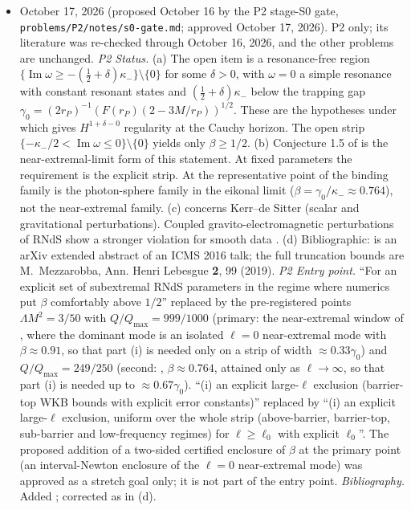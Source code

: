 \documentclass[11pt,letterpaper]{article}
\begin{document}
\begin{itemize}[leftmargin=2.6em,itemsep=1pt,topsep=2pt]
\item[v1.2] October 17, 2026 (proposed October 16 by the P2 stage-S0 gate, \texttt{problems/\allowbreak P2/\allowbreak notes/\allowbreak s0-gate.md}; approved October 17, 2026). P2 only; its literature was re-checked through October 16, 2026, and the other problems are unchanged. \emph{P2 Status.} (a) The open item is a resonance-free region $\{\operatorname{Im}\omega\ge-(\tfrac12+\delta)\kappa_-\}\setminus\{0\}$ for some $\delta>0$, with $\omega=0$ a simple resonance with constant resonant states and $(\tfrac12+\delta)\kappa_-$ below the trapping gap $\gamma_0=(2r_P)^{-1}(F(r_P)(2-3M/r_P))^{1/2}$. These are the hypotheses under which \cite{hintzvasy2017} gives $H^{1+\delta-0}$ regularity at the Cauchy horizon. The open strip $\{-\kappa_-/2<\operatorname{Im}\omega\le0\}\setminus\{0\}$ yields only $\beta\ge1/2$. (b) Conjecture 1.5 of \cite{hintz2025} is the near-extremal-limit form of this statement. At fixed parameters the requirement is the explicit strip. At the representative point of \cite[Table~I]{cardoso2018} the binding family is the photon-sphere family in the eikonal limit ($\beta=\gamma_0/\kappa_-\approx0.764$), not the near-extremal family. (c) \cite{dias2018} concerns Kerr--de Sitter (scalar and gravitational perturbations). Coupled gravito-electromagnetic perturbations of RNdS show a stronger violation for smooth data \cite{drs2018}. (d) Bibliographic: \cite{mezzarobba2016} is an arXiv extended abstract of an ICMS 2016 talk; the full truncation bounds are M.~Mezzarobba, Ann. Henri Lebesgue \textbf{2}, 99 (2019). \emph{P2 Entry point.} ``For an explicit set of subextremal RNdS parameters in the regime where numerics put $\beta$ comfortably above $1/2$'' replaced by the pre-registered points $\Lambda M^2=3/50$ with $Q/Q_{\max}=999/1000$ (primary: the near-extremal window of \cite[Fig.~3]{cardoso2018}, where the dominant mode is an isolated $\ell=0$ near-extremal mode with $\beta\approx0.91$, so that part (i) is needed only on a strip of width $\approx0.33\gamma_0$) and $Q/Q_{\max}=249/250$ (second: \cite[Table~I]{cardoso2018}, $\beta\approx0.764$, attained only as $\ell\to\infty$, so that part (i) is needed up to $\approx0.67\gamma_0$). ``(i) an explicit large-$\ell$ exclusion (barrier-top WKB bounds with explicit error constants)'' replaced by ``(i) an explicit large-$\ell$ exclusion, uniform over the whole strip (above-barrier, barrier-top, sub-barrier and low-frequency regimes) for $\ell\ge\ell_0$ with explicit $\ell_0$''. The proposed addition of a two-sided certified enclosure of $\beta$ at the primary point (an interval-Newton enclosure of the $\ell=0$ near-extremal mode) was approved as a stretch goal only; it is not part of the entry point. \emph{Bibliography.} Added \cite{drs2018}; \cite{mezzarobba2016} corrected as in (d).

\end{itemize}
\end{document}
